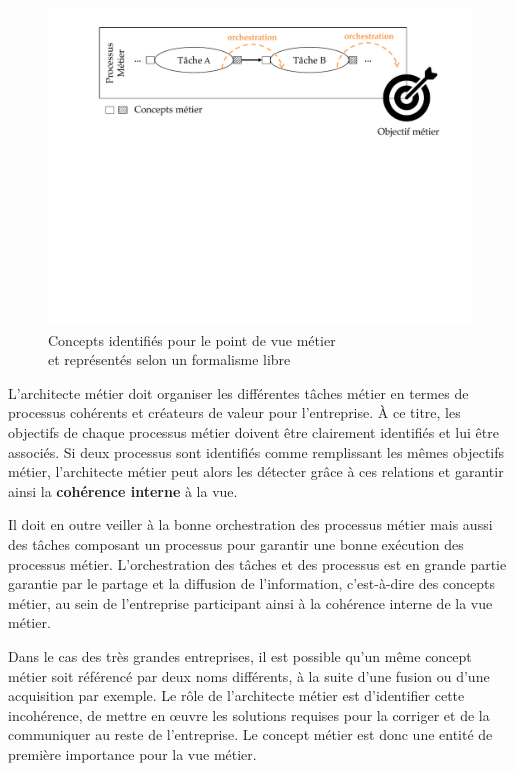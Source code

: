     \begin{figure}[!ht]
     \centering
     \includegraphics[trim= 0cm 11cm 0cm 0cm, width=1\textwidth, clip]{figures/4_demarche/concepts_vue_metier.pdf}
     \caption{Concepts identifiés pour le point de vue métier \\
              et représentés selon un formalisme libre}
     \label{fig:concepts_vue_metier}
    \end{figure}

    L'architecte métier doit organiser les différentes tâches métier en
    termes de processus cohérents et créateurs de valeur pour l'entreprise. À ce titre, les objectifs de chaque processus
    métier doivent être clairement identifiés et lui être associés.
    Si deux processus sont identifiés comme remplissant les mêmes objectifs métier, l'architecte métier
    peut alors les détecter grâce à ces relations et garantir ainsi la \textbf{cohérence interne }à la vue.

    Il doit en outre veiller à la bonne orchestration des processus métier
    mais aussi des tâches composant un processus pour garantir une bonne exécution des processus métier.
    L'orchestration des tâches et des processus est en grande partie garantie par le partage
    et la diffusion de l'information, c'est-à-dire des concepts métier, au sein de l'entreprise participant ainsi à la cohérence
    interne de la vue métier.

    Dans le cas des très grandes entreprises, il est possible qu'un même concept métier
    soit référencé par deux noms différents, à la suite d'une fusion ou d'une acquisition par exemple.
    Le rôle de l'architecte métier est d'identifier cette incohérence, de mettre en œuvre les solutions requises pour
    la corriger et de la communiquer au reste de l'entreprise.
    Le concept métier est donc une entité de première importance pour la vue métier.


